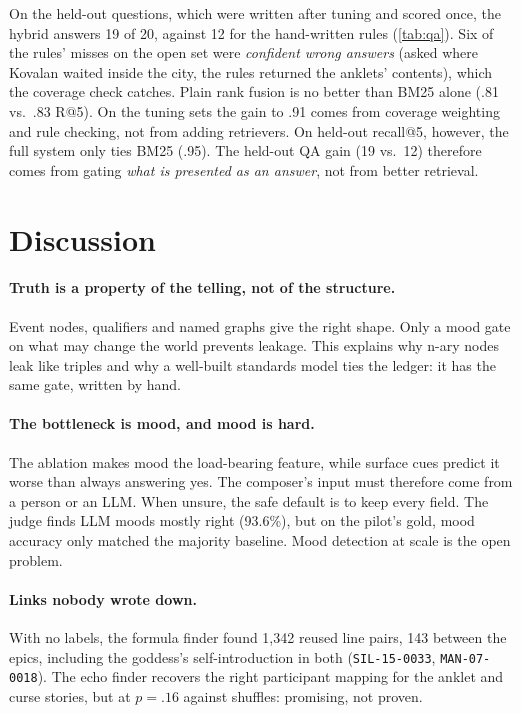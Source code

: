 \documentclass[11pt]{article}
\newcommand{\lid}[1]{\texttt{\small #1}}
\begin{document}
On the held-out questions, which were written after tuning and scored once, the hybrid answers 19 of 20, against 12 for the hand-written rules (\cref{tab:qa}). Six of the rules' misses on the open set were \emph{confident wrong answers} (asked where Kovalan waited inside the city, the rules returned the anklets' contents), which the coverage check catches. Plain rank fusion is no better than BM25 alone (.81 vs.\ .83 R@5). On the tuning sets the gain to .91 comes from coverage weighting and rule checking, not from adding retrievers. On held-out recall@5, however, the full system only ties BM25 (.95). The held-out QA gain (19 vs.\ 12) therefore comes from gating \emph{what is presented as an answer}, not from better retrieval.

\section{Discussion}
\label{sec:discussion}

\paragraph{Truth is a property of the telling, not of the structure.} Event nodes, qualifiers and named graphs give the right shape. Only a mood gate on what may change the world prevents leakage. This explains why n-ary nodes leak like triples and why a well-built standards model ties the ledger: it has the same gate, written by hand.

\paragraph{The bottleneck is mood, and mood is hard.} The ablation makes mood the load-bearing feature, while surface cues predict it worse than always answering yes. The composer's input must therefore come from a person or an LLM. When unsure, the safe default is to keep every field. The judge finds LLM moods mostly right (93.6\%), but on the pilot's gold, mood accuracy only matched the majority baseline. Mood detection at scale is the open problem.

\paragraph{Links nobody wrote down.} With no labels, the formula finder found 1,342 reused line pairs, 143 between the epics, including the goddess's self-introduction in both (\lid{SIL-15-0033}, \lid{MAN-07-0018}). The echo finder recovers the right participant mapping for the anklet and curse stories, but at $p{=}.16$ against shuffles: promising, not proven.
\end{document}

